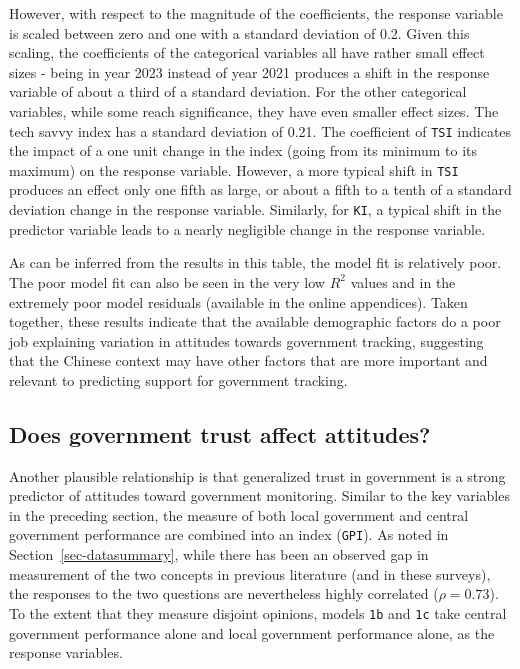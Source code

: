 \documentclass[
  letterpaper,
  DIV=11,
  numbers=noendperiod]{scrartcl}
\begin{document}
However, with respect to the magnitude of the coefficients, the response
variable is scaled between zero and one with a standard deviation of
0.2. Given this scaling, the coefficients of the categorical variables
all have rather small effect sizes - being in year 2023 instead of year
2021 produces a shift in the response variable of about a third of a
standard deviation. For the other categorical variables, while some
reach significance, they have even smaller effect sizes. The tech savvy
index has a standard deviation of 0.21. The coefficient of \texttt{TSI}
indicates the impact of a one unit change in the index (going from its
minimum to its maximum) on the response variable. However, a more
typical shift in \texttt{TSI} produces an effect only one fifth as
large, or about a fifth to a tenth of a standard deviation change in the
response variable. Similarly, for \texttt{KI}, a typical shift in the
predictor variable leads to a nearly negligible change in the response
variable.

As can be inferred from the results in this table, the model fit is
relatively poor. The poor model fit can also be seen in the very low
\(R^2\) values and in the extremely poor model residuals (available in
the online appendices). Taken together, these results indicate that the
available demographic factors do a poor job explaining variation in
attitudes towards government tracking, suggesting that the Chinese
context may have other factors that are more important and relevant to
predicting support for government tracking.

\subsection{Does government trust affect
attitudes?}\label{does-government-trust-affect-attitudes}

Another plausible relationship is that generalized trust in government
is a strong predictor of attitudes toward government monitoring. Similar
to the key variables in the preceding section, the measure of both local
government and central government performance are combined into an index
(\texttt{GPI}). As noted in Section~\ref{sec-datasummary}, while there
has been an observed gap in measurement of the two concepts in previous
literature (and in these surveys), the responses to the two questions
are nevertheless highly correlated (\(\rho=0.73\)). To the extent that
they measure disjoint opinions, models \texttt{1b} and \texttt{1c} take
central government performance alone and local government performance
alone, as the response variables.
\end{document}
